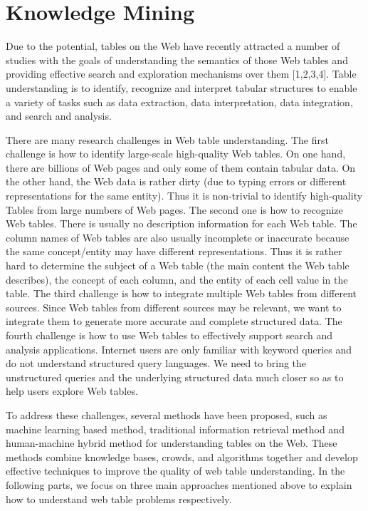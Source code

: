 \documentclass{article} %
\begin{document}
\section{Knowledge Mining}


Due to the potential, tables on the Web have recently attracted a number of studies with the goals of understanding the semantics of those Web tables and providing effective search and exploration mechanisms over them [1,2,3,4]. Table understanding is to identify, recognize and interpret tabular structures to enable a variety of tasks such as data extraction, data interpretation, data integration, and search and analysis.

There are many research challenges in Web table understanding. The first challenge is how to identify large-scale high-quality Web tables. On one hand, there are billions of Web pages and only some of them contain tabular data. On the other hand, the Web data is rather dirty (due to typing errors or different representations for the same entity). Thus it is non-trivial to identify high-quality Tables from large numbers of Web pages. The second one is how to recognize Web tables. There is usually no description information for each Web table. The column names of Web tables are also usually incomplete or inaccurate because the same concept/entity may have different representations. Thus it is rather hard to determine the subject of a Web table (the main content the Web table describes), the concept of each column, and the entity of each cell value in the table. The third challenge is how to integrate multiple Web tables from different sources. Since Web tables from different sources may be relevant, we want to integrate them to generate more accurate and complete structured data. The fourth challenge is how to use Web tables to effectively support search and analysis applications. Internet users are only familiar with keyword queries and do not understand structured query languages. We need to bring the unstructured queries and the underlying structured data much closer so as to help users explore Web tables.

To address these challenges, several methods have been proposed, such as machine learning based method, traditional information retrieval method and human-machine hybrid method for understanding tables on the Web. These methods combine knowledge bases, crowds, and algorithms together and develop effective techniques to improve the quality of web table understanding. In the following parts, we focus on three main approaches mentioned above to explain how to understand web table problems respectively.
\end{document}
